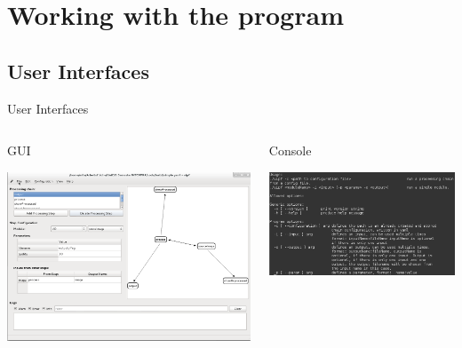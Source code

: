 \documentclass{beamer}
\begin{document}

\section{Working with the program}
\subsection{User Interfaces}
\begin{frame}[t]{User Interfaces}

	\begin{columns}
		\begin{column}[t]{.5\textwidth}
			\begin{center}
			{\Large GUI}
			\vspace{.5cm}

			\includegraphics[width=\textwidth]{images/howto/gui}

			\end{center}
		\end{column}
		\begin{column}[t]{.5\textwidth}
			\begin{center}
			{\Large Console}
			\vspace{.5cm}

			\includegraphics[width=\textwidth]{images/howto/console}


\end{center}
\end{column}
\end{columns}
\end{frame}
\end{document}
